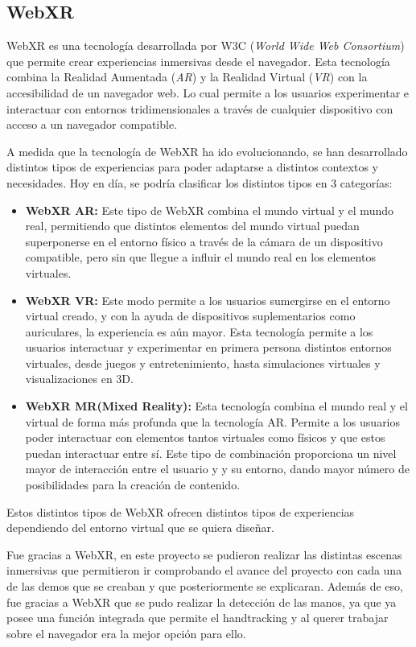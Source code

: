 \documentclass[a4paper, 12pt]{book}
\begin{document}
\subsection{WebXR}
\label{subsec:WebXR}

WebXR \cite{onirix2024} es una tecnología desarrollada por W3C (\textit{World Wide Web Consortium}) que permite crear experiencias inmersivas desde el navegador. Esta tecnología combina la Realidad Aumentada (\textit{AR}) y la Realidad Virtual (\textit{VR}) con la accesibilidad de un navegador web.
Lo cual permite a los usuarios experimentar e interactuar con entornos tridimensionales a través de cualquier dispositivo con acceso a un navegador compatible.

A medida que la tecnología de WebXR ha ido evolucionando, se han desarrollado distintos tipos de experiencias para poder adaptarse a distintos contextos y necesidades. Hoy en día, se podría clasificar los distintos tipos en 3 categorías:
\begin{itemize}
  \item \textbf{WebXR AR:} Este tipo de WebXR combina el mundo virtual y el mundo real, permitiendo que distintos elementos del mundo virtual puedan superponerse en el entorno físico a través
        de la cámara de un dispositivo compatible, pero sin que llegue a influir el mundo real en los elementos virtuales.
  \item \textbf{WebXR VR:} Este modo permite a los usuarios sumergirse en el entorno virtual creado, y con la ayuda de dispositivos suplementarios como auriculares, la experiencia es aún mayor. Esta tecnología permite a los usuarios
        interactuar y experimentar en primera persona distintos entornos virtuales, desde juegos y entretenimiento, hasta simulaciones virtuales y visualizaciones en 3D.
  \item \textbf{WebXR MR(Mixed Reality):} Esta tecnología combina el mundo real y el virtual de forma más profunda que la tecnología AR. Permite a los usuarios poder interactuar con elementos tantos virtuales como físicos y que estos puedan interactuar entre sí. Este tipo de combinación proporciona un nivel mayor de interacción entre el usuario y
        y su entorno, dando mayor número de posibilidades para la creación de contenido.
\end{itemize}

Estos distintos tipos de WebXR ofrecen distintos tipos de experiencias dependiendo del entorno virtual que se quiera diseñar.

Fue gracias a WebXR, en este proyecto se pudieron realizar las distintas escenas inmersivas que permitieron ir comprobando el avance del proyecto con cada una de las demos que se creaban y que posteriormente se explicaran. Además de eso, fue gracias a WebXR que se pudo realizar la detección de las manos, ya que ya posee una función integrada que permite el handtracking y al querer trabajar sobre el navegador era la mejor opción para ello. 
\end{document}
